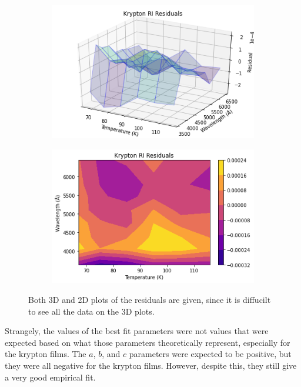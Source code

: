 \documentclass[letterpaper,12pt]{article}
\begin{document}
\begin{figure}[h!]
	\begin{subfigure}[b]{0.5\linewidth}
		\centering
		\includegraphics[width=\textwidth,height=\textheight,keepaspectratio]{krypres1.png}
	\end{subfigure}
	\begin{subfigure}[b]{0.5\linewidth}
		\centering
		\includegraphics[width=\textwidth,height=\textheight,keepaspectratio]{krypres2.png}
	\end{subfigure}
	\caption{Both 3D and 2D plots of the residuals are given, since it is diffucilt to see all the data on the 3D plots.}
\end{figure}

Strangely, the values of the best fit parameters were not values that were expected based on what those parameters theoretically represent, especially for the krypton films. The $a$, $b$, and $c$ parameters were expected to be positive, but they were all negative for the krypton films. However, despite this, they still give a very good empirical fit.
\end{document}
